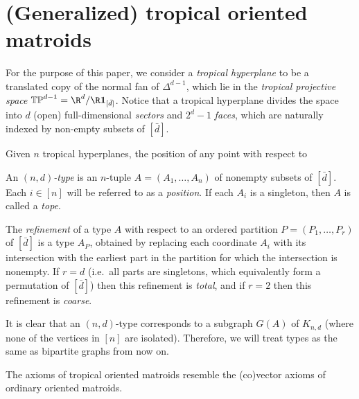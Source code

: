 \documentclass[letterpaper,reqno,11pt]{amsart}
\begin{document}
\section{(Generalized) tropical oriented matroids}\label{sec:gtom}

For the purpose of this paper, we consider a \emph{tropical hyperplane} to be a translated copy of the normal fan of $\Delta^{d-1}$, which lie in the \emph{tropical projective space} $\mathbb{TP}^{d-1} = \R^d / \R \mathbf{1}_{[\bar{d}]}$. Notice that a tropical hyperplane divides the space into $d$ (open) full-dimensional \emph{sectors} and $2^d-1$ \emph{faces}, which are naturally indexed by non-empty subsets of $[\bar{d}]$. 

Given $n$ tropical hyperplanes, the position of any point with respect to 

\begin{definition}
    An \emph{$(n,d)$-type} is an $n$-tuple $A = (A_1, \dots, A_n)$ of nonempty subsets of $[\bar{d}]$. Each $i\in [n]$ will be referred to as a \emph{position}. If each $A_i$ is a singleton, then $A$ is called a \emph{tope}.
    
    The \emph{refinement} of a type $A$ with respect to an ordered partition $P = (P_1, \dots, P_r)$ of $[\bar{d}]$ is a type $A_P$, obtained by replacing each coordinate $A_i$ with its intersection with the earliest part in the partition for which the intersection is nonempty. If $r = d$ (i.e.\ all parts are singletons, which equivalently form a permutation of $[\bar{d}]$) then this refinement is \emph{total}, and if $r = 2$ then this refinement is \emph{coarse}.
\end{definition}

\begin{remark}
    It is clear that an $(n,d)$-type corresponds to a subgraph $G(A)$ of $K_{n,d}$ (where none of the vertices in $[n]$ are isolated). Therefore, we will treat types as the same as bipartite graphs from now on.
\end{remark}

The axioms of tropical oriented matroids resemble the (co)vector axioms of ordinary oriented matroids.
\end{document}
